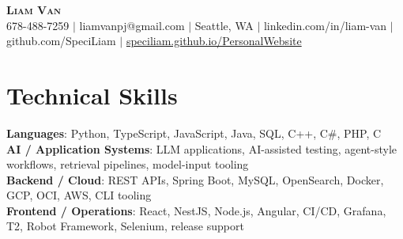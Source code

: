 \documentclass[letterpaper,11pt]{article}
\begin{document}

%
\begin{center}
    \textbf{\Huge \scshape Liam Van} \\ \vspace{1pt}
    \small 678-488-7259 $|$ \small {liamvanpj@gmail.com} $|$ Seattle, WA
 {{$|$ linkedin.com/in/liam-van} {$|$ github.com/SpeciLiam} {$|$ \href{https://speciliam.github.io/PersonalWebsite}{speciliam.github.io/PersonalWebsite}}}

\end{center}

\section{Technical Skills}
 \begin{itemize}[leftmargin=0.15in, label={}]
    \small{\item{
     \textbf{Languages}{: Python, TypeScript, JavaScript, Java, SQL, C++, C\#, PHP, C} \\
     \textbf{AI / Application Systems}{: LLM applications, AI-assisted testing, agent-style workflows, retrieval pipelines, model-input tooling} \\
     \textbf{Backend / Cloud}{: REST APIs, Spring Boot, MySQL, OpenSearch, Docker, GCP, OCI, AWS, CLI tooling} \\
     \textbf{Frontend / Operations}{: React, NestJS, Node.js, Angular, CI/CD, Grafana, T2, Robot Framework, Selenium, release support} \\
    }}
 \end{itemize}
%
\end{document}

